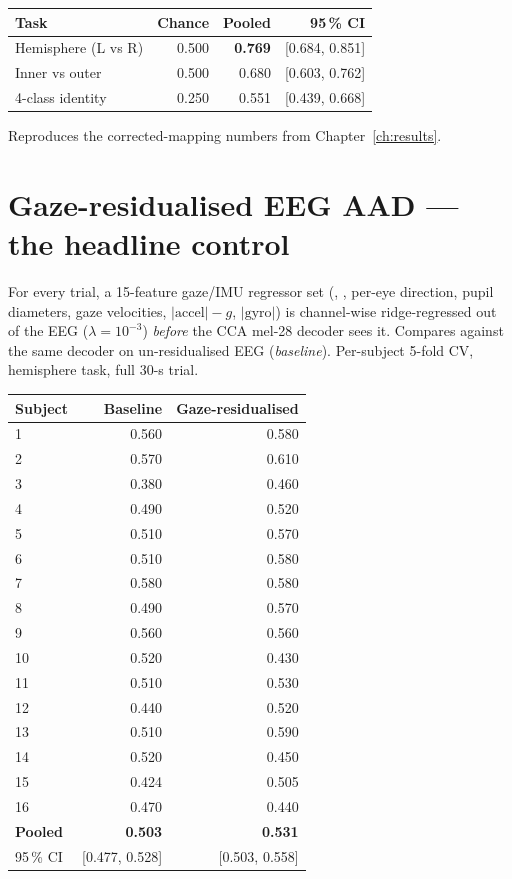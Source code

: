 \begin{table}[ht]
\centering
\begin{tabular}{lrrr}
\toprule
Task              & Chance & Pooled & 95\,\% CI \\
\midrule
Hemisphere (L vs R) & 0.500 & \textbf{0.769} & [0.684, 0.851] \\
Inner vs outer      & 0.500 & 0.680          & [0.603, 0.762] \\
4-class identity    & 0.250 & 0.551          & [0.439, 0.668] \\
\bottomrule
\end{tabular}
\end{table}

Reproduces the corrected-mapping numbers from Chapter~\ref{ch:results}.

\section{Gaze-residualised EEG AAD --- the headline control}
\label{sec:iter4-resid}

For every trial, a 15-feature gaze/IMU regressor set
(, , per-eye direction, pupil
diameters, gaze velocities, \mbox{$|\text{accel}|{-}g$}, $|\text{gyro}|$)
is channel-wise ridge-regressed out of the EEG ($\lambda {=} 10^{-3}$)
\emph{before} the CCA mel-28 decoder sees it. Compares against the same
decoder on un-residualised EEG (\emph{baseline}). Per-subject 5-fold CV,
hemisphere task, full 30-s trial.

\begin{table}[ht]
\centering
\begin{tabular}{lrr}
\toprule
Subject & Baseline & Gaze-residualised \\
\midrule
1  & 0.560 & 0.580 \\
2  & 0.570 & 0.610 \\
3  & 0.380 & 0.460 \\
4  & 0.490 & 0.520 \\
5  & 0.510 & 0.570 \\
6  & 0.510 & 0.580 \\
7  & 0.580 & 0.580 \\
8  & 0.490 & 0.570 \\
9  & 0.560 & 0.560 \\
10 & 0.520 & 0.430 \\
11 & 0.510 & 0.530 \\
12 & 0.440 & 0.520 \\
13 & 0.510 & 0.590 \\
14 & 0.520 & 0.450 \\
15 & 0.424 & 0.505 \\
16 & 0.470 & 0.440 \\
\midrule
\textbf{Pooled}    & \textbf{0.503}    & \textbf{0.531} \\
95\,\% CI          & [0.477, 0.528]    & [0.503, 0.558] \\
\bottomrule
\end{tabular}
\end{table}


